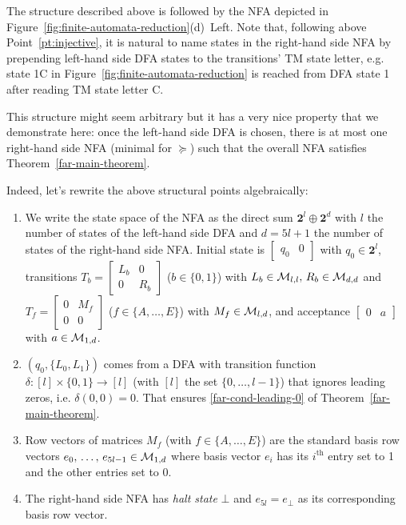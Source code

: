 \begin{example}
    The structure described above is followed by the NFA depicted in Figure~\ref{fig:finite-automata-reduction}(d)~Left. Note that, following above Point~\ref{pt:injective}, it is natural to name states in the right-hand side NFA by prepending left-hand side DFA states to the transitions' TM state letter, e.g. state 1C in Figure~\ref{fig:finite-automata-reduction} is reached from DFA state 1 after reading TM state letter C.
\end{example}

This structure might seem arbitrary but it has a very nice property that we demonstrate here: once the left-hand side DFA is chosen, there is at most one right-hand side NFA (minimal for $\succeq$) such that the overall NFA satisfies Theorem~\ref{far-main-theorem}.



Indeed, let's rewrite the above structural points algebraically:


\begin{enumerate}
    \item We write the state space of the NFA as the direct sum $\mathbf{2}^l \oplus \mathbf{2}^d$ with $l$ the number of states of the left-hand side DFA and $d=5l+1$ the number of states of the right-hand side NFA. Initial state is $\begin{bmatrix}q_0&0\end{bmatrix}$ with $q_0 \in \mathbf{2}^l$,
          transitions
          $T_b=\begin{bmatrix}L_b&0\\0&R_b\end{bmatrix}$ ($b\in\{0,1\}$) with $L_b \in \mathcal{M}_{l,l},\, R_b \in \mathcal{M}_{d,d}$ and
          $T_f=\begin{bmatrix}0&M_f\\0&0\end{bmatrix}$ ($f\in\{A,\ldots,E\}$) with $M_f \in \mathcal{M}_{l,d}$,
          and acceptance $\begin{bmatrix}0&a\end{bmatrix}$ with $a \in \mathcal{M}_{1,d}$.
    \item $(q_0,\{L_0, L_1\})$ comes from a DFA with transition function $\delta: [l] \times \{0,1\} \to [l]$ (with $[l]$ the set $\{0,\dots,l-1\}$) that ignores leading zeros, i.e. $\delta(0,0) = 0$. That ensures \eqref{far-cond-leading-0} of Theorem~\ref{far-main-theorem}.
    \item Row vectors of matrices $M_f$ (with $f\in\{A,\ldots,E\}$) are the standard basis row vectors $e_0,\, \dots,\, e_{5l-1} \in \mathcal{M}_{1,d}$ where basis vector $e_i$ has its $i^\text{th}$ entry set to 1 and the other entries set to 0.\label{pt:basis}
    \item The right-hand side NFA has \textit{halt state} $\bot$ and $e_{5l} = e_\bot$ as its corresponding basis row vector.

\end{enumerate}


